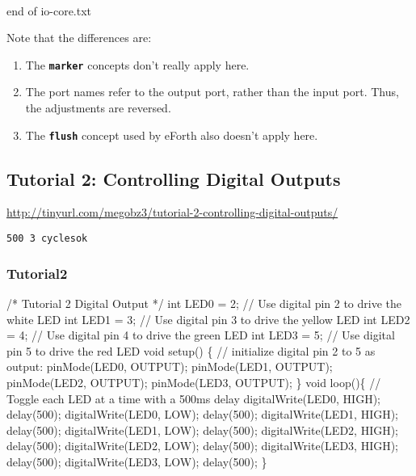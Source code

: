 \documentclass[10pt,english]{article}
\begin{document}
\\ end of io-core.txt
\nwendcode{}\nwdocspar

Note that the differences are:
\begin{enumerate}
\item The \texttt{\textbf{marker}} concepts don't really apply here.
\item The port names refer to the output port, rather than the input port.
Thus, the adjustments are reversed.
\item The \texttt{\textbf{flush}} concept used by eForth also doesn't apply
here.
\end{enumerate}

\subsection{Tutorial 2: Controlling Digital Outputs}

\url{http://tinyurl.com/megobz3/tutorial-2-controlling-digital-outputs/}

\begin{lstlisting}
500 3 cyclesok
\end{lstlisting}



\subsubsection{Tutorial2}

\nwenddocs{}\endmoddef
/*
Tutorial 2 Digital Output
*/
int LED0  = 2;     // Use digital pin 2 to drive the white LED
int LED1  = 3;     // Use digital pin 3 to drive the yellow LED
int LED2  = 4;     // Use digital pin 4 to drive the green LED
int LED3  = 5;     // Use digital pin 5 to drive the red LED
void setup() \{
  // initialize digital pin 2 to 5 as output:
  pinMode(LED0, OUTPUT);  
  pinMode(LED1, OUTPUT);  
  pinMode(LED2, OUTPUT);  
  pinMode(LED3, OUTPUT);  
\}
void loop()\{
  // Toggle each LED at a time with a 500ms delay
  digitalWrite(LED0, HIGH);
  delay(500);
  digitalWrite(LED0, LOW);
  delay(500);
  digitalWrite(LED1, HIGH);
  delay(500);
  digitalWrite(LED1, LOW);
  delay(500); 
  digitalWrite(LED2, HIGH);
  delay(500);
  digitalWrite(LED2, LOW);
  delay(500); 
  digitalWrite(LED3, HIGH);
  delay(500);
  digitalWrite(LED3, LOW);
  delay(500); 
\}
\nwendcode{}\nwdocspar
\end{document}
